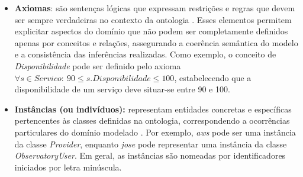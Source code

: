 \begin{itemize}
    \item \textbf{Axiomas}: são sentenças lógicas que expressam restrições e regras que devem ser sempre verdadeiras no contexto da ontologia \cite{corcho2005building}. Esses elementos permitem explicitar aspectos do domínio que não podem ser completamente definidos apenas por conceitos e relações, assegurando a coerência semântica do modelo e a consistência das inferências realizadas. Como exemplo, o conceito de \textit{Disponibilidade} pode ser definido pelo axioma $\forall s \in Servico:\ 90 \leq s.Disponibilidade \leq 100$, estabelecendo que a disponibilidade de um serviço deve situar-se entre 90 e 100.
    \item \textbf{Instâncias (ou indivíduos):} representam entidades concretas e específicas pertencentes às classes definidas na ontologia, correspondendo a ocorrências particulares do domínio modelado \cite{corcho2005building}. Por exemplo, \textit{aws} pode ser uma instância da classe \textit{Provider}, enquanto \textit{jose} pode representar uma instância da classe \textit{ObservatoryUser}. Em geral, as instâncias são nomeadas por identificadores iniciados por letra minúscula.
\end{itemize}


